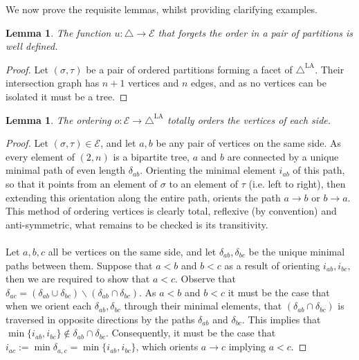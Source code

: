\documentclass{amsart}
\newtheorem{lemma}[theorem]{Lemma}
\theoremstyle{definition}
\newcommand{\ssm}{\smallsetminus} %
\newcommand{\LAD}{\triangle^{\mathrm{LA}}}
\newcommand{\EC}{\mathcal{E}} %
\newcommand{\OP}{\triangle} %
\begin{document}
We now prove the requisite lemmas, whilst providing clarifying examples.
\begin{lemma} 
\label{l:u-well-defined}
The function $u:\OP \to \EC$ that forgets the order in a pair of partitions is well defined.
\end{lemma}
\begin{proof}
Let $(\sigma,\tau)$ be a pair of ordered partitions forming a facet of $\LAD$. 
Their intersection graph has $n+1$ vertices and $n$ edges, and as no vertices can be isolated it must be a tree. 
\end{proof}

\begin{lemma}\label{l:o-provides-total-order}
The ordering $o:\EC\to \LAD$ totally orders the vertices of each side.
\end{lemma}
\begin{proof}
Let $(\sigma,\tau)\in \EC$, and let $a,b$ be any pair of vertices on the same side.
As every element of $(2,n)$ is a bipartite tree, $a$ and $b$ are connected by a unique minimal path of even length $\delta_{ab}$.
Orienting the minimal element $i_{ab}$ of this path, so that it points from an element of $\sigma$ to an element of $\tau$ (i.e. left to right), then extending this orientation along the entire path, orients the path $a\to b$ or $b\to a$.
This method of ordering vertices is clearly total, reflexive (by convention) and anti-symmetric, what remains to be checked is its transitivity.
\\\\
Let $a,b,c$ all be vertices on the same side, and let $\delta_{ab},\delta_{bc}$ be the unique minimal paths between them.
Suppose that $a<b$ and $b<c$ as a result of orienting $i_{ab},i_{bc}$, then we are required to show that $a<c$.
Observe that $\delta_{ac}= (\delta_{ab} \cup \delta_{bc}) \ssm (\delta_{ab} \cap \delta_{bc})$.
As $a<b$ and $b<c$ it must be the case that when we orient each $\delta_{ab},\delta_{bc}$ through their minimal elements, that $(\delta_{ab} \cap \delta_{bc})$ is traversed in opposite directions by the paths $\delta_{ab}$ and $\delta_{bc}$.
This implies that $\min \{i_{ab},i_{bc} \} \not \in \delta_{ab} \cap \delta_{bc}$.
Consequently, it must be the case that $i_{ac}:=\min \delta_{a,c} = \min \{i_{ab},i_{bc} \}$, which orients $a\to c$ implying $a<c$.
\end{proof}
\end{document}
